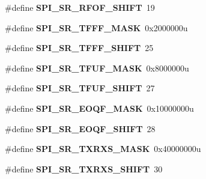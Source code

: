 \begin{DoxyCompactItemize}
\item 
\#define {\bfseries S\+P\+I\+\_\+\+S\+R\+\_\+\+R\+F\+O\+F\+\_\+\+S\+H\+I\+FT}~19\hypertarget{group__SPI__Register__Masks_ga6ceb5392843b8d85ed2f00305b524870}{}\label{group__SPI__Register__Masks_ga6ceb5392843b8d85ed2f00305b524870}

\item 
\#define {\bfseries S\+P\+I\+\_\+\+S\+R\+\_\+\+T\+F\+F\+F\+\_\+\+M\+A\+SK}~0x2000000u\hypertarget{group__SPI__Register__Masks_gaa2b1ac1e36caec8d6c547c45e9436b5d}{}\label{group__SPI__Register__Masks_gaa2b1ac1e36caec8d6c547c45e9436b5d}

\item 
\#define {\bfseries S\+P\+I\+\_\+\+S\+R\+\_\+\+T\+F\+F\+F\+\_\+\+S\+H\+I\+FT}~25\hypertarget{group__SPI__Register__Masks_ga8cc4f0762da38ecb90793428c8e5a26c}{}\label{group__SPI__Register__Masks_ga8cc4f0762da38ecb90793428c8e5a26c}

\item 
\#define {\bfseries S\+P\+I\+\_\+\+S\+R\+\_\+\+T\+F\+U\+F\+\_\+\+M\+A\+SK}~0x8000000u\hypertarget{group__SPI__Register__Masks_gaa7abad389fa7a46434442b742d4a35c3}{}\label{group__SPI__Register__Masks_gaa7abad389fa7a46434442b742d4a35c3}

\item 
\#define {\bfseries S\+P\+I\+\_\+\+S\+R\+\_\+\+T\+F\+U\+F\+\_\+\+S\+H\+I\+FT}~27\hypertarget{group__SPI__Register__Masks_ga0e5f44b6803f40e8db0718fe2812092a}{}\label{group__SPI__Register__Masks_ga0e5f44b6803f40e8db0718fe2812092a}

\item 
\#define {\bfseries S\+P\+I\+\_\+\+S\+R\+\_\+\+E\+O\+Q\+F\+\_\+\+M\+A\+SK}~0x10000000u\hypertarget{group__SPI__Register__Masks_gaf90e19a9b8d8a54d8ae278820d8f1558}{}\label{group__SPI__Register__Masks_gaf90e19a9b8d8a54d8ae278820d8f1558}

\item 
\#define {\bfseries S\+P\+I\+\_\+\+S\+R\+\_\+\+E\+O\+Q\+F\+\_\+\+S\+H\+I\+FT}~28\hypertarget{group__SPI__Register__Masks_ga0395371ab4e76da4f99c89bc6963e816}{}\label{group__SPI__Register__Masks_ga0395371ab4e76da4f99c89bc6963e816}

\item 
\#define {\bfseries S\+P\+I\+\_\+\+S\+R\+\_\+\+T\+X\+R\+X\+S\+\_\+\+M\+A\+SK}~0x40000000u\hypertarget{group__SPI__Register__Masks_ga82001e6d6fa1c1e51ab330a4d6b209c5}{}\label{group__SPI__Register__Masks_ga82001e6d6fa1c1e51ab330a4d6b209c5}

\item 
\#define {\bfseries S\+P\+I\+\_\+\+S\+R\+\_\+\+T\+X\+R\+X\+S\+\_\+\+S\+H\+I\+FT}~30\hypertarget{group__SPI__Register__Masks_ga596b82d7dd4fe7f24ea66c19a9413b96}{}\label{group__SPI__Register__Masks_ga596b82d7dd4fe7f24ea66c19a9413b96}


\end{DoxyCompactItemize}
